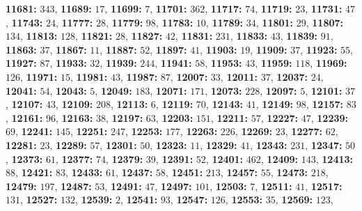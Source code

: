 \textsf{\bfseries 11681:} $343$, \textsf{\bfseries 11689:} $17$, \textsf{\bfseries 11699:} $7$, \textsf{\bfseries 11701:} $362$, \textsf{\bfseries 11717:} $74$, \textsf{\bfseries 11719:} $23$, \textsf{\bfseries 11731:} $47$, \textsf{\bfseries 11743:} $24$, \textsf{\bfseries 11777:} $28$, \textsf{\bfseries 11779:} $98$, \textsf{\bfseries 11783:} $10$, \textsf{\bfseries 11789:} $34$, \textsf{\bfseries 11801:} $29$, \textsf{\bfseries 11807:} $134$, \textsf{\bfseries 11813:} $128$, \textsf{\bfseries 11821:} $28$, \textsf{\bfseries 11827:} $42$, \textsf{\bfseries 11831:} $231$, \textsf{\bfseries 11833:} $43$, \textsf{\bfseries 11839:} $91$, \textsf{\bfseries 11863:} $37$, \textsf{\bfseries 11867:} $11$, \textsf{\bfseries 11887:} $52$, \textsf{\bfseries 11897:} $41$, \textsf{\bfseries 11903:} $19$, \textsf{\bfseries 11909:} $37$, \textsf{\bfseries 11923:} $55$, \textsf{\bfseries 11927:} $87$, \textsf{\bfseries 11933:} $32$, \textsf{\bfseries 11939:} $244$, \textsf{\bfseries 11941:} $58$, \textsf{\bfseries 11953:} $43$, \textsf{\bfseries 11959:} $118$, \textsf{\bfseries 11969:} $126$, \textsf{\bfseries 11971:} $15$, \textsf{\bfseries 11981:} $43$, \textsf{\bfseries 11987:} $87$, \textsf{\bfseries 12007:} $33$, \textsf{\bfseries 12011:} $37$, \textsf{\bfseries 12037:} $24$, \textsf{\bfseries 12041:} $54$, \textsf{\bfseries 12043:} $5$, \textsf{\bfseries 12049:} $183$, \textsf{\bfseries 12071:} $171$, \textsf{\bfseries 12073:} $228$, \textsf{\bfseries 12097:} $5$, \textsf{\bfseries 12101:} $37$, \textsf{\bfseries 12107:} $43$, \textsf{\bfseries 12109:} $208$, \textsf{\bfseries 12113:} $6$, \textsf{\bfseries 12119:} $70$, \textsf{\bfseries 12143:} $41$, \textsf{\bfseries 12149:} $98$, \textsf{\bfseries 12157:} $83$, \textsf{\bfseries 12161:} $96$, \textsf{\bfseries 12163:} $38$, \textsf{\bfseries 12197:} $63$, \textsf{\bfseries 12203:} $151$, \textsf{\bfseries 12211:} $57$, \textsf{\bfseries 12227:} $47$, \textsf{\bfseries 12239:} $69$, \textsf{\bfseries 12241:} $145$, \textsf{\bfseries 12251:} $247$, \textsf{\bfseries 12253:} $177$, \textsf{\bfseries 12263:} $226$, \textsf{\bfseries 12269:} $23$, \textsf{\bfseries 12277:} $62$, \textsf{\bfseries 12281:} $23$, \textsf{\bfseries 12289:} $57$, \textsf{\bfseries 12301:} $50$, \textsf{\bfseries 12323:} $11$, \textsf{\bfseries 12329:} $41$, \textsf{\bfseries 12343:} $231$, \textsf{\bfseries 12347:} $50$, \textsf{\bfseries 12373:} $61$, \textsf{\bfseries 12377:} $74$, \textsf{\bfseries 12379:} $39$, \textsf{\bfseries 12391:} $52$, \textsf{\bfseries 12401:} $462$, \textsf{\bfseries 12409:} $143$, \textsf{\bfseries 12413:} $88$, \textsf{\bfseries 12421:} $83$, \textsf{\bfseries 12433:} $61$, \textsf{\bfseries 12437:} $58$, \textsf{\bfseries 12451:} $213$, \textsf{\bfseries 12457:} $55$, \textsf{\bfseries 12473:} $218$, \textsf{\bfseries 12479:} $197$, \textsf{\bfseries 12487:} $53$, \textsf{\bfseries 12491:} $47$, \textsf{\bfseries 12497:} $101$, \textsf{\bfseries 12503:} $7$, \textsf{\bfseries 12511:} $41$, \textsf{\bfseries 12517:} $131$, \textsf{\bfseries 12527:} $132$, \textsf{\bfseries 12539:} $2$, \textsf{\bfseries 12541:} $93$, \textsf{\bfseries 12547:} $126$, \textsf{\bfseries 12553:} $35$, \textsf{\bfseries 12569:} $123$, 
